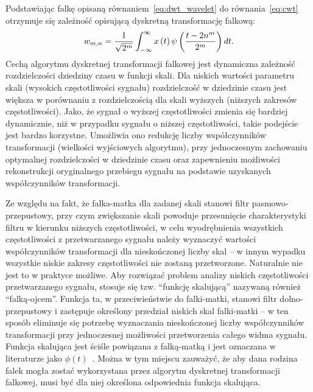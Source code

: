 Podstawiając falkę opisaną równaniem~\eqref{eq:dwt_wavelet} do równania~\eqref{eq:cwt} otrzymuje się zależność opisującą dyskretną transformację falkową:
\begin{equation}
w_{m,n} = \frac{1}{\sqrt{2^{m}}} \int _{-\infty} ^{\infty} x \left(t\right) \psi \left(\frac{t-2n^{m}}{2^{m}}\right) dt \label{eq:dwt}.
\end{equation}
Cechą algorytmu dyskretnej transformacji falkowej jest dynamiczna zależność rozdzielczości dziedziny czasu w funkcji skali. Dla niskich wartości parametru skali (wysokich częstotliwości sygnału) rozdzielczość w dziedzinie czasu jest większa w porównaniu z rozdzielczością dla skali wyższych (niższych zakresów częstotliwości). Jako, że sygnał o wyższej częstotliwości zmienia się bardziej dynamicznie, niż w przypadku sygnału o niższej częstotliwości, takie podejście jest bardzo korzystne. Umożliwia ono redukcję liczby współczynników transformacji (wielkości wyjściowych algorytmu), przy jednoczesnym zachowaniu optymalnej rozdzielczości w dziedzinie czasu oraz zapewnieniu możliwości rekonstrukcji oryginalnego przebiegu sygnału na podstawie uzyskanych współczynników transformacji.

Ze względu na fakt, że falka-matka dla zadanej skali stanowi filtr pasmowo-przepustowy, przy czym zwiększanie skali powoduje przesunięcie charakterystyki filtru w kierunku niższych częstotliwości, w celu wyodrębnienia wszystkich częstotliwości z przetwarzanego sygnału należy wyznaczyć wartości współczynników transformacji dla nieskończonej liczby skal -- w innym wypadku wszystkie niskie zakresy częstotliwości nie zostaną przetworzone. Naturalnie nie jest to w praktyce możliwe. Aby rozwiązać problem analizy niskich częstotliwości przetwarzanego sygnału, stosuje się tzw. \enquote{funkcję skalującą} nazywaną również \enquote{falką-ojcem}. Funkcja ta, w przeciwieństwie do falki-matki, stanowi filtr dolno-przepustowy i zastępuje określony przedział niskich skal falki-matki -- w ten sposób eliminuje się potrzebę wyznaczania nieskończonej liczby współczynników transformacji przy jednoczesnej możliwości przetworzenia całego widma sygnału. Funkcja skalująca jest ściśle powiązana z falką-matką i jest oznaczana w literaturze jako $\phi(t)$~\cite{wallen_handbook}. Można w tym miejscu zauważyć, że aby dana rodzina falek mogła zostać wykorzystana przez algorytm dyskretnej transformacji falkowej, musi być dla niej określona odpowiednia funkcja skalująca.

